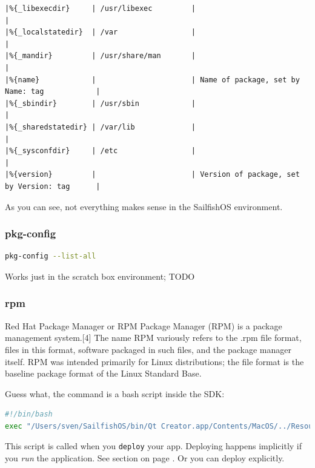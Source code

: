 \begin{lstlisting}[language=clean,basicstyle=\ttfamily\tiny]
|%{_libexecdir}	    | /usr/libexec         |                                              |
|%{_localstatedir}  | /var                 |                                              |
|%{_mandir}	        | /usr/share/man       |                                              |
|%{name}            |                      | Name of package, set by Name: tag            |
|%{_sbindir}        | /usr/sbin            |                                              |
|%{_sharedstatedir} | /var/lib             |                                              |
|%{_sysconfdir}	    | /etc                 |                                              |
|%{version}         |                      | Version of package, set by Version: tag      |
\end{lstlisting}
%
As you can see, not everything makes sense in the SailfishOS environment.
%
%
\subsubsection{pkg-config}\label{subsubsec:pkgconfig}
%
\begin{lstlisting}[language=bash]
pkg-config --list-all
\end{lstlisting}
%
Works just in the scratch box environment; TODO
%
%
\subsubsection{rpm}\label{subsubsec:rpm}
%
Red Hat Package Manager or RPM Package Manager (RPM) is a package management system.[4] The name RPM variously refers to the .rpm file format, files in this format, software packaged in such files, and the package manager itself. RPM was intended primarily for Linux distributions; the file format is the baseline package format of the Linux Standard Base\cite{wiki03}.

Guess what, the command is a bash script inside the SDK:
%
\begin{lstlisting}[language=bash]
#!/bin/bash
exec "/Users/sven/SailfishOS/bin/Qt Creator.app/Contents/MacOS/../Resources/merssh" -sdktoolsdir "/Users/sven/.config/SailfishAlpha3/mer-sdk-tools/MerSDK" -commandtype mb2 -mertarget SailfishOS-i486-x86 rpm $@oluhuone:SailfishOS-i486-x86
\end{lstlisting}
%
This script is called when you \verb,deploy, your app. Deploying happens implicitly if you \emph{run} the application. See section  on page \pageref{subsubsec:runsettings}. Or you can deploy explicitly.

